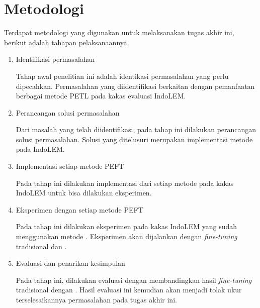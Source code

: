\section{Metodologi}

Terdapat metodologi yang digunakan untuk melaksanakan tugas akhir ini, berikut adalah tahapan pelaksanaannya.

\begin{enumerate}
    \item Identifikasi permasalahan

    Tahap awal penelitian ini adalah identikasi permasalahan yang perlu dipecahkan. Permasalahan yang diidentifikasi berkaitan dengan pemanfaatan berbagai metode PETL pada kakas evaluasi IndoLEM.

    \item Perancangan solusi permasalahan

    Dari masalah yang telah diidentifikasi, pada tahap ini dilakukan perancangan solusi permasalahan. Solusi yang ditelusuri merupakan implementasi metode \PEFT pada IndoLEM.

    \item Implementasi setiap metode PEFT

    Pada tahap ini dilakukan implementasi dari setiap metode \PEFT pada kakas IndoLEM untuk bisa dilakukan eksperimen.

    \item Eksperimen dengan setiap metode PEFT

    Pada tahap ini dilakukan eksperimen pada kakas IndoLEM yang sudah menggunakan metode \PEFT. Eksperimen akan dijalankan dengan \textit{fine-tuning} tradisional dan \PEFT.

    \item Evaluasi dan penarikan kesimpulan

    Pada tahap ini, dilakukan evaluasi dengan membandingkan hasil \textit{fine-tuning} tradisional dengan \PEFT. Hasil evaluasi ini kemudian akan menjadi tolak ukur terselesaikannya permasalahan pada tugas akhir ini.

\end{enumerate}
